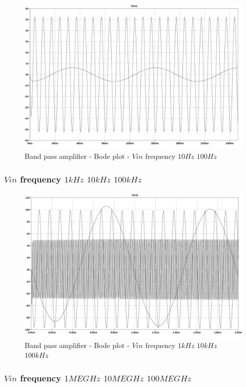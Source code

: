 \documentclass[10pt,a4paper]{article}
\begin{document}
\begin{figure}[H]
  \centering
  \includegraphics[width=14cm]{graph/2d4a.jpg}
  \caption{Band pass amplifier - Bode plot - $Vin$ frequency $10Hz$ $100Hz$}
  \label{2d4agraph}
\end{figure}

\subsubsection{$Vin$ frequency $1kHz$ $10kHz$ $100kHz$}


\begin{figure}[H]
  \centering
  \includegraphics[width=14cm]{graph/2d4b.jpg}
  \caption{Band pass amplifier - Bode plot - $Vin$ frequency $1kHz$ $10kHz$ $100kHz$}
  \label{2d4bgraph}
\end{figure}

\subsubsection{$Vin$ frequency $1MEGHz$ $10MEGHz$ $100MEGHz$}

\end{document}
